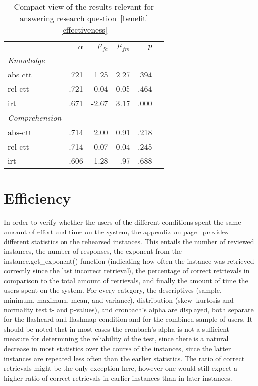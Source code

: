 \begin{table}
    \centering
    \begin{tabular}{lrrrrr}
        \toprule
        & $\alpha$ & $\mu_{fc}$ & $\mu_{fm}$ & $p$ \\
        \midrule
        \emph{Knowledge} &&&& \\
        \midrule
        abs-ctt & .721 & 1.25 & 2.27 & .394 \\
        rel-ctt & .721 & 0.04 & 0.05 & .464 \\
        irt & .671 & -2.67 & 3.17 & .000 \\
        \midrule
        \emph{Comprehension} &&&& \\
        \midrule
        abs-ctt & .714 & 2.00 & 0.91 & .218 \\
        rel-ctt & .714 & 0.07 & 0.04 & .245\\
        irt & .606 & -1.28 & -.97 & .688 \\
        \bottomrule
    \end{tabular}
    \caption{Compact view of the results relevant for answering research question~\protect\ref{benefit}\protect\ref{effectiveness}}
    \label{tab:learning_gain_effect}
\end{table}

\section{Efficiency}

In order to verify whether the users of the different conditions spent the same amount of effort and time on the system, the  appendix on page~\pageref{app:instance_stats} provides different statistics on the rehearsed instances. This entails the number of reviewed instances, the number of responses, the exponent from the instance.get\_exponent() function (indicating how often the instance was retrieved correctly since the last incorrect retrieval), the percentage of correct retrievals in comparison to the total amount of retrievals, and finally the amount of time the users spent on the system. For every category, the descriptives (sample, minimum, maximum, mean, and variance), distribution (skew, kurtosis and normality test t- and p-values), and cronbach's alpha are displayed, both separate for the flashcard and flashmap condition and for the combined sample of users. It should be noted that in most cases the cronbach's alpha is not a sufficient measure for determining the reliability of the test, since there is a natural decrease in most statistics over the course of the instances, since the latter instances are repeated less often than the earlier statistics. The ratio of correct retrievals might be the only exception here, however one would still expect a higher ratio of correct retrievals in earlier instances than in later instances. 

